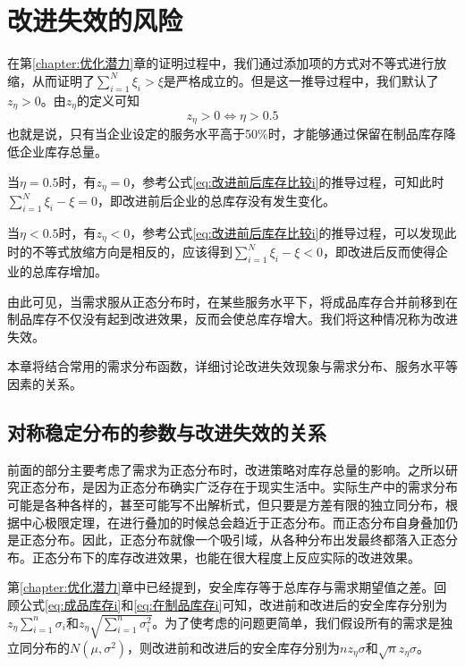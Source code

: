 
\chapter{改进失效的风险}

在第\ref{chapter:优化潜力}章的证明过程中，我们通过添加项的方式对不等式进行放缩，从而证明了$\sum_{i=1}^N\xi_i > \xi$是严格成立的。但是这一推导过程中，我们默认了$z_\eta>0$。由$z_\eta$的定义可知
\[
z_\eta>0 \Longleftrightarrow \eta > 0.5
\]
也就是说，只有当企业设定的服务水平高于50\%时，才能够通过保留在制品库存降低企业库存总量。

当$\eta=0.5$时，有$z_\eta=0$，参考公式\ref{eq:改进前后库存比较i}的推导过程，可知此时$\sum_{i=1}^N\xi_i - \xi = 0$，即改进前后企业的总库存没有发生变化。

当$\eta<0.5$时，有$z_\eta<0$，参考公式\ref{eq:改进前后库存比较i}的推导过程，可以发现此时的不等式放缩方向是相反的，应该得到$\sum_{i=1}^N\xi_i - \xi < 0$，即改进后反而使得企业的总库存增加。

由此可见，当需求服从正态分布时，在某些服务水平下，将成品库存合并前移到在制品库存不仅没有起到改进效果，反而会使总库存增大。我们将这种情况称为改进失效。

本章将结合常用的需求分布函数，详细讨论改进失效现象与需求分布、服务水平等因素的关系。







\section{对称稳定分布的参数与改进失效的关系}

前面的部分主要考虑了需求为正态分布时，改进策略对库存总量的影响。之所以研究正态分布，是因为正态分布确实广泛存在于现实生活中。实际生产中的需求分布可能是各种各样的，甚至可能写不出解析式，但只要是方差有限的独立同分布，根据中心极限定理，在进行叠加的时候总会趋近于正态分布。而正态分布自身叠加仍是正态分布。因此，正态分布就像一个吸引域，从各种分布出发最终都落入正态分布。正态分布下的库存改进效果，也能在很大程度上反应实际的改进效果。

第\ref{chapter:优化潜力}章中已经提到，安全库存等于总库存与需求期望值之差。回顾公式\ref{eq:成品库存i}和\ref{eq:在制品库存i}可知，改进前和改进后的安全库存分别为$z_{\eta}\sum_{i=1}^n\sigma_i$和$z_\eta\sqrt{\sum_{i=1}^n\sigma_i^2}$。为了使考虑的问题更简单，我们假设所有的需求是独立同分布的$N(\mu,\sigma^2)$，则改进前和改进后的安全库存分别为$nz_\eta\sigma$和$\sqrt{n}z_\eta\sigma$。

